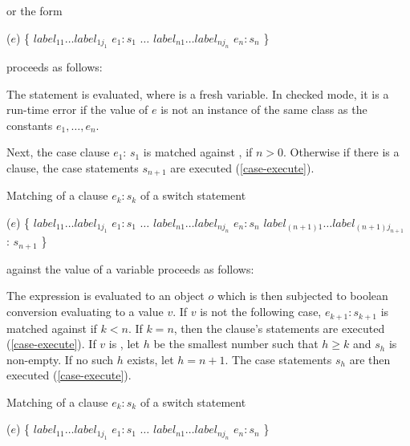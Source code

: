 \documentclass{article}
\begin{document}
or the form

\begin{dartCode}
\SWITCH{} ($e$) \{
   $label_{11} \ldots label_{1j_1}$ \CASE{} $e_1: s_1$
   $\ldots$
   $label_{n1} \ldots label_{nj_n}$ \CASE{} $e_n: s_n$
\}
\end{dartCode}

proceeds as follows:

\LMHash{}
The statement  is evaluated, where \id{} is a fresh variable.
In checked mode, it is a run-time error if the value of $e$ is not an instance of the same class as the constants $e_1, \ldots, e_n$.


\LMHash{}
Next, the case clause \CASE{} $e_{1}$: $s_{1}$ is matched against \id, if $n > 0$.
Otherwise if there is a \DEFAULT{} clause, the case statements $s_{n+1}$ are executed (\ref{case-execute}).

\LMHash{}
Matching of a \CASE{} clause \CASE{} $e_{k}: s_{k}$ of a switch statement

\begin{dartCode}
\SWITCH{} ($e$) \{
   $label_{11} \ldots label_{1j_1}$ \CASE{} $e_1: s_1$
   $\ldots$
   $label_{n1} \ldots label_{nj_n}$ \CASE{} $e_n: s_n$
   $label_{(n+1)1} \ldots label_{(n+1)j_{n+1}}$ \DEFAULT{}: $s_{n+1}$
\}
\end{dartCode}

against the value of a variable \id{} proceeds as follows:

\LMHash{}
The expression  is evaluated to an object $o$ which is then subjected to boolean conversion evaluating to a value $v$.
If $v$ is not \TRUE{} the following case, \CASE{} $e_{k+1}: s_{k+1}$ is matched against \id{} if $k < n$.
If $k = n$, then the \DEFAULT{} clause's statements are executed (\ref{case-execute}).
If $v$ is \TRUE{}, let $h$ be the smallest number such that $h \ge k$ and $s_h$ is non-empty.
If no such $h$ exists, let $h = n + 1$.
The case statements $s_h$ are then executed (\ref{case-execute}).

\LMHash{}
Matching of a \CASE{} clause \CASE{} $e_{k}: s_{k}$ of a switch statement

\begin{dartCode}
\SWITCH{} ($e$) \{
   $label_{11} \ldots label_{1j_1}$ \CASE{} $e_1: s_1$
   $\ldots$
   $label_{n1} \ldots label_{nj_n}$ \CASE{} $e_n: s_n$
\}
\end{dartCode}
\end{document}
